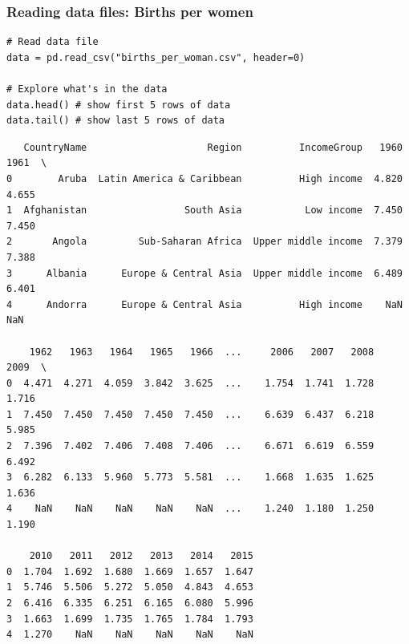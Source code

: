 \documentclass[pdf]{beamer}
\begin{document}
\begin{frame}[fragile]
\frametitle{Reading data files: Births per women}

\begin{lstlisting}[style=python]
# Read data file
data = pd.read_csv("births_per_woman.csv", header=0)

# Explore what's in the data 
data.head() # show first 5 rows of data
data.tail() # show last 5 rows of data
\end{lstlisting}

\vspace{-0.8cm}
{\fontsize{5}{6}\selectfont
\begin{verbatim}
   CountryName                     Region          IncomeGroup   1960   1961  \
0        Aruba  Latin America & Caribbean          High income  4.820  4.655   
1  Afghanistan                 South Asia           Low income  7.450  7.450   
2       Angola         Sub-Saharan Africa  Upper middle income  7.379  7.388   
3      Albania      Europe & Central Asia  Upper middle income  6.489  6.401   
4      Andorra      Europe & Central Asia          High income    NaN    NaN   

    1962   1963   1964   1965   1966  ...     2006   2007   2008   2009  \
0  4.471  4.271  4.059  3.842  3.625  ...    1.754  1.741  1.728  1.716   
1  7.450  7.450  7.450  7.450  7.450  ...    6.639  6.437  6.218  5.985   
2  7.396  7.402  7.406  7.408  7.406  ...    6.671  6.619  6.559  6.492   
3  6.282  6.133  5.960  5.773  5.581  ...    1.668  1.635  1.625  1.636   
4    NaN    NaN    NaN    NaN    NaN  ...    1.240  1.180  1.250  1.190   

    2010   2011   2012   2013   2014   2015  
0  1.704  1.692  1.680  1.669  1.657  1.647  
1  5.746  5.506  5.272  5.050  4.843  4.653  
2  6.416  6.335  6.251  6.165  6.080  5.996  
3  1.663  1.699  1.735  1.765  1.784  1.793  
4  1.270    NaN    NaN    NaN    NaN    NaN 
\end{verbatim}}

\end{frame}
\end{document}

